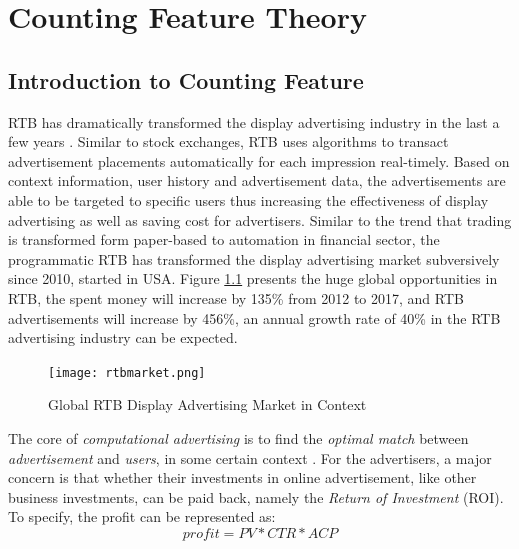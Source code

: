 \chapter{Counting Feature Theory}
\label{chapterlabel4}

\section{Introduction to Counting Feature}

RTB has dramatically transformed the display advertising industry in the last a few years \cite{yuan2013real}. Similar to stock exchanges, RTB uses algorithms to transact advertisement placements automatically for each impression real-timely. Based on context information, user history and advertisement data, the advertisements are able to be targeted to specific users thus increasing the effectiveness of display advertising as well as saving cost for advertisers. Similar to the trend that trading is transformed form paper-based to automation in financial sector, the programmatic RTB has transformed the display advertising market subversively since 2010, started in USA. Figure \ref{fig:rtbmarket} presents the huge global opportunities in RTB, the spent money will increase by 135\% from 2012 to 2017, and RTB advertisements will increase by 456\%, an annual growth rate of  40\% in the RTB advertising industry can be expected\cite{rtb2015}.

\begin{figure}[h]
\centering
\texttt{[image: rtbmarket.png]}
\caption{Global RTB Display Advertising Market in Context}
\label{fig:rtbmarket}
\end{figure}

The core of \textit{computational advertising} is to find the \textit{optimal match} between \textit{advertisement} and \textit{users}, in some certain context \cite{balakrishnan2014real}. For the advertisers, a major concern is that whether their investments in online advertisement, like other business investments, can be paid back, namely the \textit{Return of Investment} (ROI). To specify, the profit can be represented as:\
\begin{equation}
profit = PV * CTR * ACP
\end{equation}

